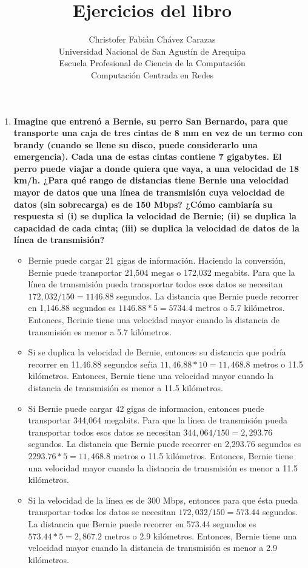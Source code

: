 \documentclass[a4paper,12pt]{article}
\begin{document}
\title{Ejercicios del libro}
\author{
Christofer Fabián Chávez Carazas \\
\small{Universidad Nacional de San Agustín de Arequipa} \\
\small{Escuela Profesional de Ciencia de la Computación} \\
\small{Computación Centrada en Redes}
}
\date{}

\maketitle

\begin{enumerate}
 \item \textbf{Imagine que entrenó a Bernie, su perro San Bernardo, para que transporte una caja de tres cintas de 8 mm
en vez de un termo con brandy (cuando se llene su disco, puede considerarlo una emergencia). Cada una de
estas cintas contiene 7 gigabytes. El perro puede viajar a donde quiera que vaya, a una velocidad de 18 km/h.
¿Para qué rango de distancias tiene Bernie una velocidad mayor de datos que una línea de transmisión cuya
velocidad de datos (sin sobrecarga) es de 150 Mbps? ¿Cómo cambiaría su respuesta si (i) se duplica la velocidad
de Bernie; (ii) se duplica la capacidad de cada cinta; (iii) se duplica la velocidad de datos de la línea
de transmisión?}

\begin{itemize}
 \item Bernie puede cargar 21 gigas de información. Haciendo la conversión, Bernie puede transportar 21,504 megas o 172,032 megabits.
  Para que la línea de transmisión pueda transportar todos esos datos se necesitan $172,032 / 150 = 1146.88$ segundos.
  La distancia que Bernie puede recorrer en 1,146.88 segundos es $1146.88 * 5 = 5734.4$ metros o 5.7 kilómetros. Entonces, Berinie
  tiene una velocidad mayor cuando la distancia de transmisión es menor a 5.7 kilómetros.
 \item Si se duplica la velocidad de Bernie, entonces su distancia que podría recorrer en 11,46.88 segundos seŕia $11,46.88 * 10 = 11,468.8$ metros o 11.5 kilómetros.
  Entonces, Bernie tiene una velocidad mayor cuando la distancia de transmisión es menor a 11.5 kilómetros.
 \item Si Bernie puede cargar 42 gigas de informacion, entonces puede transportar 344,064 megabits. Para que la línea de transmisión pueda transportar todos esos datos
  se necesitan $344,064 / 150 = 2,293.76$ segundos. La distancia que Bernie puede recorrer en 2,293.76 segundos es $2293.76 * 5 = 11,468.8$ metros o 11.5 kilómetros.
  Entonces, Bernie tiene una velocidad mayor cuando la distancia de transmisión es menor a 11.5 kilómetros.
 \item Si la velocidad de la línea es de 300 Mbps, entonces para que ésta pueda transportar todos los datos se necesitan $172,032/ 150 = 573.44$ segundos.
  La distancia que Bernie puede recorrer en 573.44 segundos es $573.44 * 5 = 2,867.2$ metros o 2.9 kilómetros.
  Entonces, Bernie tiene una  velocidad mayor cuando la distancia de transmisión es menor a 2.9 kilómetros.
\end{itemize}


\end{enumerate}
\end{document}
